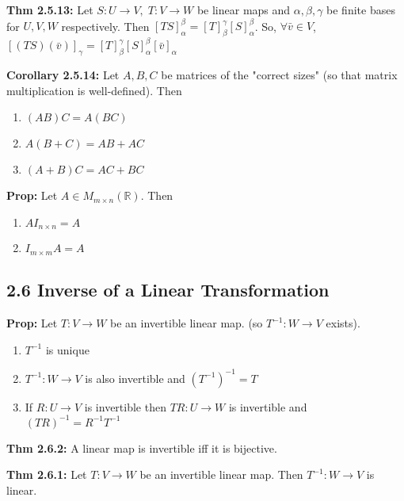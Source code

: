 \bigskip 

\noindent 
\textbf{Thm 2.5.13:} Let $S: U \rightarrow V, \; T: V \rightarrow W$ be linear maps and $\alpha, \beta, \gamma$ be finite bases for $U, V, W$ respectively. 
Then $[TS]_\alpha^\beta = [T]_\beta^\gamma[S]_\alpha^\beta$. 
So, $\forall \bar v \in V$, $[(TS)(\bar v)]_\gamma = [T]_\beta^\gamma[S]_\alpha^\beta[\bar v]_\alpha$

\bigskip 

\noindent 
\textbf{Corollary 2.5.14:} Let $A, B, C$ be matrices of the "correct sizes" (so that matrix multiplication is well-defined). Then 
\begin{enumerate}
    \item $(AB)C = A(BC)$
    \item $A(B + C) = AB + AC$
    \item $(A + B)C = AC + BC$
\end{enumerate}

\bigskip 
\noindent
\textbf{Prop:} Let $A \in M_{m \times n}(\mathbb{R})$. Then 
\begin{enumerate}
    \item $AI_{n \times n} = A$ 
    \item $I_{m \times m}A = A$
\end{enumerate}

\subsection*{2.6 Inverse of a Linear Transformation}

\textbf{Prop:} Let $T: V \rightarrow W$ be an invertible linear map. (so $T^{-1}: W \rightarrow V$ exists).
\begin{enumerate}
    \item $T^{-1}$ is unique 
    \item $T^{-1}: W \rightarrow V$ is also invertible and $(T^{-1})^{-1} = T$
    \item If $R: U \rightarrow V$ is invertible then $TR: U \rightarrow W$ is invertible and $(TR)^{-1} = R^{-1}T^{-1}$
\end{enumerate}

\bigskip 

\noindent 
\textbf{Thm 2.6.2:} A linear map is invertible iff it is bijective. 

\bigskip 

\noindent 
\textbf{Thm 2.6.1:} Let $T: V \rightarrow W$ be an invertible linear map. Then $T^{-1}:W \rightarrow V$ is linear. 

